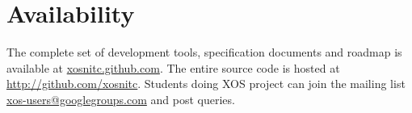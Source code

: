 \documentclass{sig-alternate}
\begin{document}
\section{Availability}
The complete set of development tools, specification documents and roadmap is available at \url{xosnitc.github.com}. The entire source code is hosted at \url{http://github.com/xosnitc}. Students doing XOS project can join the mailing list \url{xos-users@googlegroups.com} and post queries.


\vspace{1in}

%
%
\end{document}

